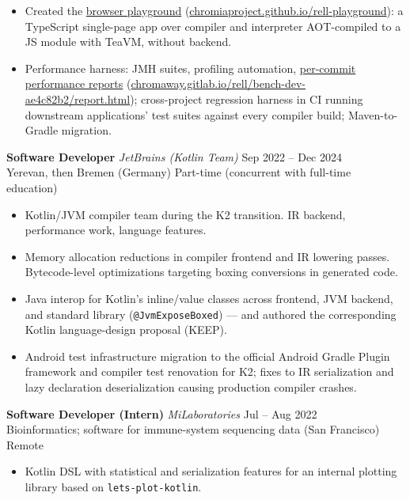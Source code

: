 \documentclass[10pt,a4paper]{article}
\newcommand{\role}[4]{%
  \needspace{4\baselineskip}%
  \noindent\textbf{#1} \textemdash{} \textit{#2} \hfill {\small\color{subtle}#3}\\[-0.25em]
  {\small\color{subtle}#4}\par\vspace{0.1em}
}
\begin{document}
\begin{itemize}
  \item Created the \href{https://chromiaproject.github.io/rell-playground/}{browser playground} (\url{chromiaproject.github.io/rell-playground}): a TypeScript single-page app over compiler and interpreter AOT-compiled to a JS module with TeaVM, without backend.
  \item Performance harness: JMH suites, profiling automation, \href{https://chromaway.gitlab.io/rell/bench-dev-ae4c82b2/report.html}{per-commit performance reports} (\url{chromaway.gitlab.io/rell/bench-dev-ae4c82b2/report.html}); cross-project regression harness in CI running downstream applications' test suites against every compiler build; Maven-to-Gradle migration.
\end{itemize}

\role{Software Developer}{JetBrains (Kotlin Team)}{Sep 2022 -- Dec 2024}{Yerevan, then Bremen (Germany) \textbullet{} Part-time (concurrent with full-time education)}
\begin{itemize}
  \item Kotlin/JVM compiler team during the K2 transition. IR backend, performance work, language features.
  \item Memory allocation reductions in compiler frontend and IR lowering passes. Bytecode-level optimizations targeting boxing conversions in generated code.
  \item Java interop for Kotlin's inline/value classes across frontend, JVM backend, and standard library (\texttt{@JvmExposeBoxed}) --- and authored the corresponding Kotlin language-design proposal (KEEP).
  \item Android test infrastructure migration to the official Android Gradle Plugin framework and compiler test renovation for K2; fixes to IR serialization and lazy declaration deserialization causing production compiler crashes.
\end{itemize}

\role{Software Developer (Intern)}{MiLaboratories}{Jul -- Aug 2022}{Bioinformatics; software for immune-system sequencing data (San Francisco) \textbullet{} Remote}
\begin{itemize}
  \item Kotlin DSL with statistical and serialization features for an internal plotting library based on \texttt{lets-plot-kotlin}.
\end{itemize}
\end{document}
